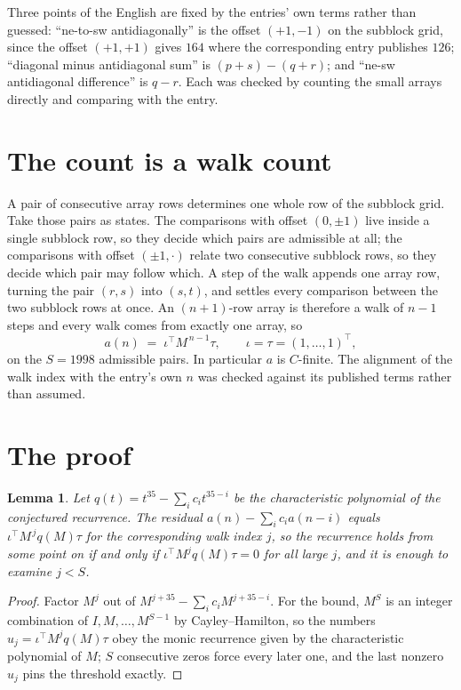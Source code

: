 \documentclass[11pt,a4paper]{article}
\theoremstyle{plain}
\newtheorem{lemma}[theorem]{Lemma}
\theoremstyle{definition}
\begin{document}
Three points of the English are fixed by the entries' own terms rather than guessed:
``ne-to-sw antidiagonally'' is the offset $(+1,-1)$ on the subblock grid, since the offset
$(+1,+1)$ gives $164$ where the corresponding entry publishes $126$; ``diagonal minus
antidiagonal sum'' is $(p+s)-(q+r)$; and ``ne-sw antidiagonal difference'' is $q-r$. Each was
checked by counting the small arrays directly and comparing with the entry.

\section{The count is a walk count}

A pair of consecutive array rows determines one whole row of the subblock grid. Take those
pairs as states. The comparisons with offset $(0,\pm1)$ live inside a single subblock row, so
they decide which pairs are admissible at all; the comparisons with offset $(\pm1,\cdot)$
relate two consecutive subblock rows, so they decide which pair may follow which. A step of the
walk appends one array row, turning the pair $(r,s)$ into $(s,t)$, and settles every comparison
between the two subblock rows at once. An $(n+1)$-row array is therefore a walk of $n-1$ steps
and every walk comes from exactly one array, so
\[
a(n)\;=\;\iota^{\!\top}M^{\,n-1}\tau,\qquad \iota=\tau=(1,\dots,1)^{\!\top},
\]
on the $S=1998$ admissible pairs. In particular $a$ is $C$-finite. The alignment of the walk
index with the entry's own $n$ was checked against its published terms rather than assumed.

\section{The proof}

\begin{lemma}\label{lem:crit}
Let $q(t)=t^{35}-\sum_i c_it^{35-i}$ be the characteristic polynomial of the
conjectured recurrence. The residual $a(n)-\sum_ic_ia(n-i)$ equals
$\iota^{\!\top}M^{\,j}q(M)\tau$ for the corresponding walk index $j$, so the recurrence
holds from some point on if and only if $\iota^{\!\top}M^{j}q(M)\tau=0$ for all large $j$,
and it is enough to examine $j<S$.
\end{lemma}

\begin{proof}
Factor $M^{j}$ out of $M^{j+35}-\sum_ic_iM^{j+35-i}$. For the bound, $M^{S}$
is an integer combination of $I,M,\dots,M^{S-1}$ by Cayley--Hamilton, so the numbers
$u_j=\iota^{\!\top}M^{j}q(M)\tau$ obey the monic recurrence given by the characteristic
polynomial of $M$; $S$ consecutive zeros force every later one, and the last nonzero $u_j$
pins the threshold exactly.
\end{proof}
\end{document}
